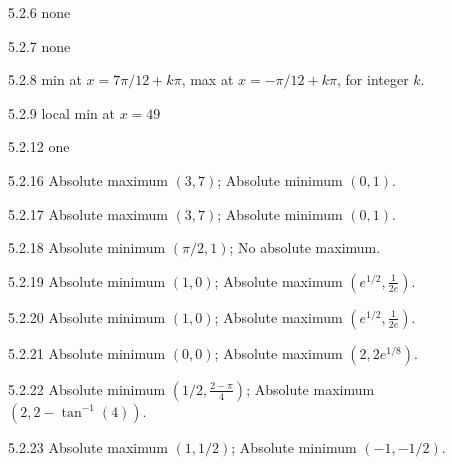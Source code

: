 \begin{Answer}{5.2.6}
		none
	
\end{Answer}
\begin{Answer}{5.2.7}
		none
	
\end{Answer}
\begin{Answer}{5.2.8}
		min at $x=7\pi/12+k\pi$, max at $x=-\pi/12+k\pi$, for integer $k$.
	
\end{Answer}
\begin{Answer}{5.2.9}
		local min at $x=49$
	
\end{Answer}
\begin{Answer}{5.2.12}
		one
	
\end{Answer}
\begin{Answer}{5.2.16}
		Absolute maximum $(3,7)$; Absolute minimum $(0,1)$.
	
\end{Answer}
\begin{Answer}{5.2.17}
		Absolute maximum $(3,7)$; Absolute minimum $(0,1)$.
	
\end{Answer}
\begin{Answer}{5.2.18}
		Absolute minimum $(\pi/2,1)$; No absolute maximum.
	
\end{Answer}
\begin{Answer}{5.2.19}
		Absolute minimum $(1,0)$; Absolute maximum $(e^{1/2},\frac{1}{2e})$.
	
\end{Answer}
\begin{Answer}{5.2.20}
		Absolute minimum $(1,0)$; Absolute maximum $(e^{1/2},\frac{1}{2e})$.
	
\end{Answer}
\begin{Answer}{5.2.21}
		Absolute minimum $(0,0)$; Absolute maximum $(2,2e^{1/8})$.
	
\end{Answer}
\begin{Answer}{5.2.22}
		Absolute minimum $(1/2,\frac{2-\pi}{4})$; Absolute maximum $(2,2-\tan^{-1}(4))$.
	
\end{Answer}
\begin{Answer}{5.2.23}
		Absolute maximum $(1,1/2)$; Absolute minimum $(-1,-1/2)$.
	
\end{Answer}
